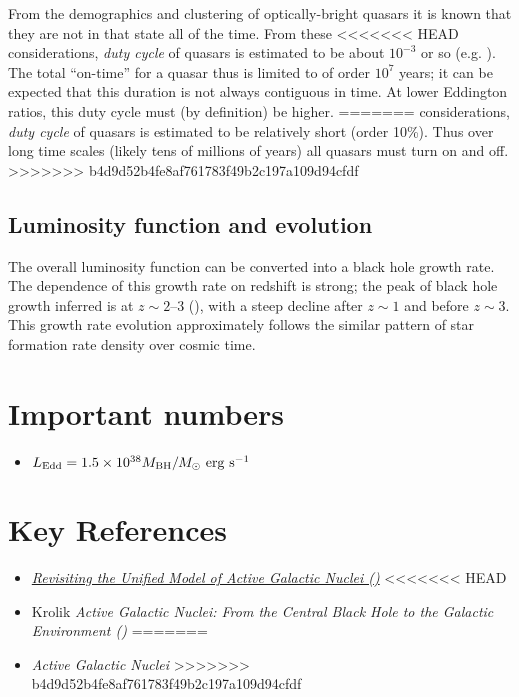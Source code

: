 From the demographics and clustering of optically-bright quasars it is
known that they are not in that state all of the time. From these
<<<<<<< HEAD
considerations, {\it duty cycle} of quasars is estimated to be about
$10^{-3}$ or so (e.g. \citealt{shankar10a}). The total ``on-time'' for
a quasar thus is limited to of order $10^7$ years; it can be expected
that this duration is not always contiguous in time. At lower
Eddington ratios, this duty cycle must (by definition) be higher.
=======
considerations, {\it duty cycle} of quasars is estimated to be
relatively short (order 10\%). Thus over long time scales (likely tens
of millions of years) all quasars must turn on and off.
>>>>>>> b4d9d52b4fe8af761783f49b2c197a109d94cfdf

\subsection{Luminosity function and evolution}

The overall luminosity function can be converted into a black hole
growth rate. The dependence of this growth rate on redshift is
strong; the peak of black hole growth inferred is at $z\sim 2$--3
(\citealt{shankar09a}), with a steep decline after $z\sim 1$ and
before $z\sim 3$. This growth rate evolution approximately follows the
similar pattern of star formation rate density over cosmic time.


\section{Important numbers}

\begin{itemize}
\item $L_{\rm Edd} = 1.5 \times 10^{38} M_{\rm BH} / M_\odot {\rm
~erg~s}^{-1}$
\end{itemize}

\section{Key References}

\begin{itemize}
  \item
    \href{https://ui.adsabs.harvard.edu/abs/2015ARA%26A..53..365N/abstract}
    {{\it Revisiting the Unified Model of Active Galactic Nuclei
      (\citealt{netzer15a})}}
<<<<<<< HEAD
  \item
    Krolik {\it Active Galactic Nuclei: From the Central Black Hole to
    the Galactic Environment (\citealt{krolik99a})}
=======
  \item {\it Active Galactic Nuclei} 
>>>>>>> b4d9d52b4fe8af761783f49b2c197a109d94cfdf
\end{itemize}


